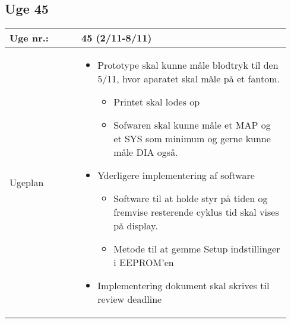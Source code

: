 	\subsection{Uge 45}
	\begin{longtable}{|p{0.24\linewidth}|p{0.7\linewidth}|}
		\hline
		Uge nr.: & 45 (2/11-8/11)\\ \hline
		Ugeplan & 
		\begin{itemize}
			\item Prototype skal kunne måle blodtryk til den 5/11, hvor aparatet skal måle på et fantom.
			\begin{itemize}
				\item Printet skal lodes op
				\item Sofwaren skal kunne måle et MAP og et SYS som minimum og gerne kunne måle DIA også.
			\end{itemize}
			\item Yderligere implementering af software
			\begin{itemize}
				\item Software til at holde styr på tiden og fremvise resterende cyklus tid skal vises på display.
				\item Metode til at gemme Setup indstillinger i EEPROM’en
			\end{itemize}
			\item Implementering dokument skal skrives til review deadline
		\end{itemize}
		

\end{longtable}
